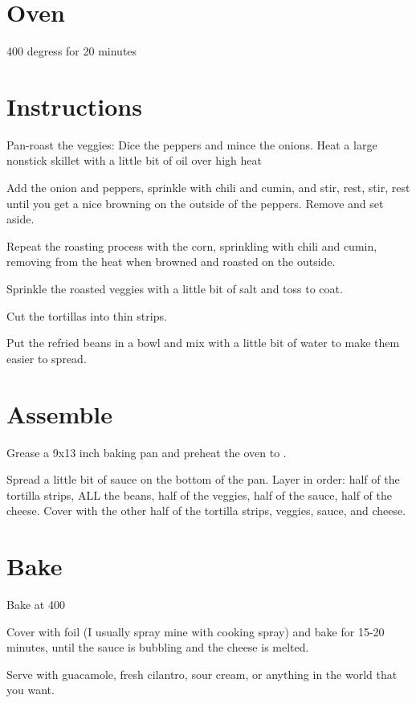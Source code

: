 \documentclass[ansiapaper,10pt,english]{sphinxmanual}
\begin{document}
\section{Oven}
\label{\detokenize{Mexican_Pepper_Cassarole:oven}}
400 degress for 20 minutes


\section{Instructions}
\label{\detokenize{Mexican_Pepper_Cassarole:instructions}}
Pan-roast the veggies: Dice the peppers and mince the onions. Heat a large nonstick skillet with a little bit of oil over high heat

Add the onion and peppers, sprinkle with chili and cumin, and stir, rest, stir, rest until you get a nice browning on the outside of the peppers. Remove and set aside.

Repeat the roasting process with the corn, sprinkling with chili and cumin, removing from the heat when browned and roasted on the outside.

Sprinkle the roasted veggies with a little bit of salt and toss to coat.

Cut the tortillas into thin strips.

Put the refried beans in a bowl and mix with a little bit of water to make them easier to spread.


\section{Assemble}
\label{\detokenize{Mexican_Pepper_Cassarole:assemble}}
Grease a 9x13 inch baking pan and preheat the oven to .

Spread a little bit of sauce on the bottom of the pan. Layer in order: half of the tortilla strips, ALL the beans, half of the veggies, half of the sauce, half of the cheese. Cover with the other half of the tortilla strips, veggies, sauce, and cheese.


\section{Bake}
\label{\detokenize{Mexican_Pepper_Cassarole:bake}}
Bake at 400

Cover with foil (I usually spray mine with cooking spray) and bake for 15-20 minutes, until the sauce is bubbling and the cheese is melted.

Serve with guacamole, fresh cilantro, sour cream, or anything in the world that you want.
\end{document}
